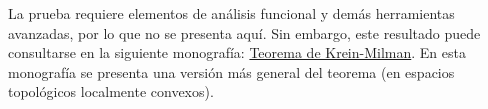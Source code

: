 \documentclass[12pt]{report}
\theoremstyle{largebreak}
\begin{document}
La prueba requiere elementos de análisis funcional y demás herramientas avanzadas, por lo que no se presenta aquí. Sin embargo, este resultado puede consultarse en la siguiente monografía: \href{https://www.mate.unlp.edu.ar/publicaciones/08112010160003.pdf}{Teorema de Krein-Milman}. En esta monografía se presenta una versión más general del teorema (en espacios topológicos localmente convexos).
\end{document}
